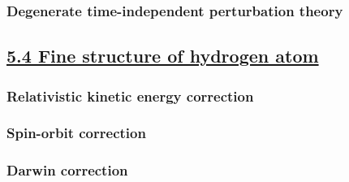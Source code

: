 \subsubsection{Degenerate time-independent perturbation theory}

\subsection{\underline{5.4 Fine structure of hydrogen atom}}

\subsubsection{Relativistic kinetic energy correction}

\subsubsection{Spin-orbit correction}

\subsubsection{Darwin correction}

